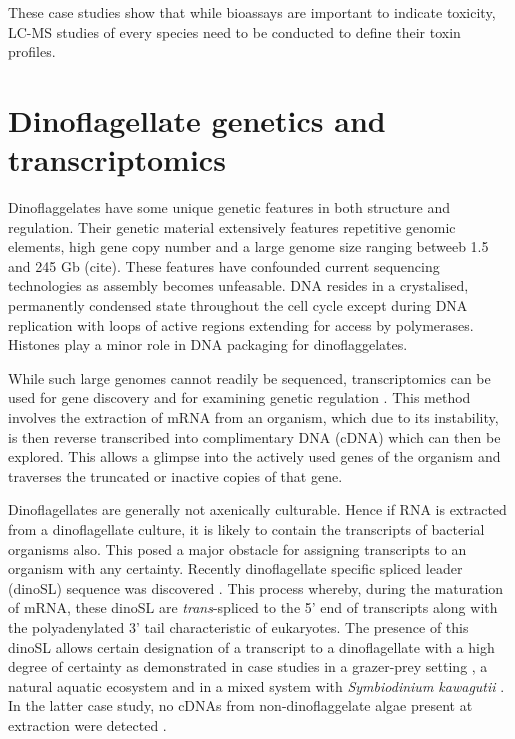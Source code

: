 \documentclass[12pt]{article}
\begin{document}
These case studies show that while bioassays are important to indicate toxicity, LC-MS studies of every species need to be conducted to define their toxin profiles.

\section{Dinoflagellate genetics and transcriptomics}
Dinoflaggelates have some unique genetic features in both structure and regulation. Their genetic material extensively features repetitive genomic elements, high gene copy number and a large genome size ranging betweeb 1.5 and 245 Gb (cite). These features have confounded current sequencing technologies as assembly becomes unfeasable. DNA resides in a crystalised, permanently condensed state throughout the cell cycle except during DNA replication with loops of active regions extending for access by polymerases. Histones play a minor role in DNA packaging for dinoflaggelates.

While such large genomes cannot readily be sequenced, transcriptomics can be used for gene discovery and for examining genetic regulation \cite{murray2012transcriptomics}. This method involves the extraction of mRNA from an organism, which due to its instability, is then reverse transcribed into complimentary DNA (cDNA) which can then be explored. This allows a glimpse into the actively used genes of the organism and traverses the truncated or inactive copies of that gene.

Dinoflagellates are generally not axenically culturable. Hence if RNA is extracted from a dinoflagellate culture, it is likely to contain the transcripts of bacterial organisms also. This posed a major obstacle for assigning transcripts to an organism with any certainty. Recently dinoflagellate specific spliced leader (dinoSL) sequence was discovered \cite{zhang2007spliced}. This process whereby, during the maturation of mRNA, these dinoSL are \emph{trans}-spliced to the 5' end of transcripts along with the polyadenylated 3' tail characteristic of eukaryotes. The presence of this dinoSL allows certain designation of a transcript to a dinoflagellate  with a high degree of certainty as demonstrated in case studies in a grazer-prey setting \cite{lin2010dinoflagellate}, a natural aquatic ecosystem \cite{lin2010spliced} and in a mixed system with \emph{Symbiodinium kawagutii} \cite{zhang2013proof}. In the latter case study, no cDNAs from non-dinoflaggelate algae present at extraction were detected \cite{zhang2013proof}.
\end{document}

